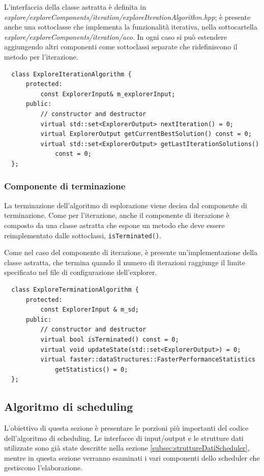 L'interfaccia della classe astratta è definita in 
\emph{explore/exploreComponents/iteration/exploreIterationAlgorithm.hpp}; è 
presente anche una sottoclasse che implementa la funzionalità iterativa, nella 
sottocartella \emph{explore/exploreComponents/iteration/aco}. In ogni caso si 
può estendere aggiungendo altri componenti come sottoclassi separate che 
ridefiniscono il metodo per l'iterazione.
\newline
\begin{verbatim}
  class ExploreIterationAlgorithm {
      protected:
          const ExplorerInput& m_explorerInput;
      public:
          // constructor and destructor
          virtual std::set<ExplorerOutput> nextIteration() = 0;
          virtual ExplorerOutput getCurrentBestSolution() const = 0;
          virtual std::set<ExplorerOutput> getLastIterationSolutions()
              const = 0;
  };
\end{verbatim}


\subsubsection{Componente di terminazione}
La terminazione dell'algoritmo di esplorazione viene decisa dal componente di 
terminazione. Come per l'iterazione, anche il componente di iterazione è 
composto da una classe astratta che espone un metodo che deve essere 
reimplementato dalle sottoclassi, \verb+isTerminated()+.

Come nel caso del componente di iterazione, è presente un'implementazione della 
classe astratta, che termina quando il numero di iterazioni raggiunge il limite 
specificato nel file di configurazione dell'explorer.
\newline
\begin{verbatim}
  class ExploreTerminationAlgorithm {
      protected:
          const ExplorerInput & m_sd;
      public:
          // constructor and destructor
          virtual bool isTerminated() const = 0;
          virtual void updateState(std::set<ExplorerOutput>) = 0;
          virtual faster::dataStructures::FasterPerformanceStatistics 
              getStatistics() = 0;
  };
\end{verbatim}


\subsection{Algoritmo di scheduling}
\label{subsec:algoritmoScheduling}
L'obiettivo di questa sezione è presentare le porzioni più importanti del 
codice dell'algoritmo di scheduling. Le interfacce di input/output e le 
strutture dati utilizzate sono già state descritte nella sezione 
\ref{subsec:struttureDatiScheduler}, mentre in questa sezione verranno esaminati i 
vari componenti dello scheduler che gestiscono l'elaborazione.

